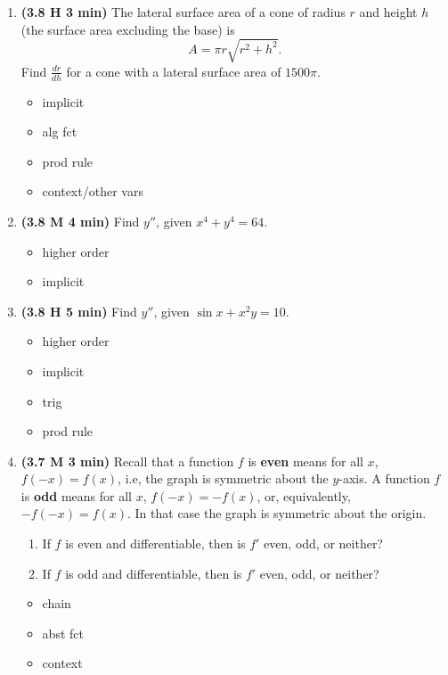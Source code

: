 \documentclass[12pt]{article}
\begin{document}
\begin{enumerate}[1.]
\item {\bf (3.8 H 3 min)} The lateral surface area of a cone of radius $r$ and height $h$ (the surface area excluding the base) is 
\[
A=\pi r\sqrt{r^2+h^2}.
\]
Find $\frac{dr}{dh}$ for a cone with a lateral surface area of $1500\pi$.
{\bf\begin{itemize}
\item implicit
\item alg fct
\item prod rule
\item context/other vars
\end{itemize}}

\item {\bf (3.8 M 4 min)} Find $y''$, given $x^4+y^4=64$.
{\bf\begin{itemize}
\item higher order
\item implicit
\end{itemize}}

\item {\bf (3.8 H 5 min)} Find $y''$, given $\sin x+x^2y=10$.
{\bf\begin{itemize}
\item higher order
\item implicit
\item trig
\item prod rule
\end{itemize}}

\item {\bf (3.7 M 3 min)} Recall that a function $f$ is \textbf{even} means for all $x$, $f(-x)=f(x)$, i.e, the graph is symmetric about the $y$-axis.  A function $f$ is \textbf{odd} means for all $x$, $f(-x)=-f(x)$, or, equivalently, $-f(-x)=f(x)$.  In that case the graph is symmetric about the origin.   
\begin{enumerate}
	\item If $f$ is even and differentiable, then is $f'$ even, odd, or neither?
	
	\item If $f$ is odd and differentiable, then is $f'$ even, odd, or neither? 
\end{enumerate}	
{\bf\begin{itemize}
\item chain
\item abst fct
\item context
\end{itemize}}


\end{enumerate}
\end{document}

